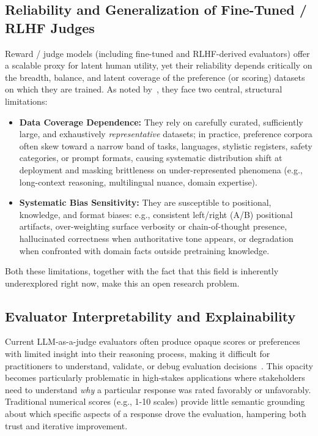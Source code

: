 \subsection{Reliability and Generalization of Fine-Tuned / RLHF Judges}
Reward / judge models (including fine-tuned and RLHF-derived evaluators) offer a scalable proxy for latent human utility, yet their reliability depends critically on the breadth, balance, and latent coverage of the preference (or scoring) datasets on which they are trained. As noted by~\cite{zhu2023judgelm}, they face two central, structural limitations:
\begin{itemize}
	\item \textbf{Data Coverage Dependence:} They rely on carefully curated, sufficiently large, and exhaustively \emph{representative} datasets; in practice, preference corpora often skew toward a narrow band of tasks, languages, stylistic registers, safety categories, or prompt formats, causing systematic distribution shift at deployment and masking brittleness on under-represented phenomena (e.g., long-context reasoning, multilingual nuance, domain expertise).
	\item \textbf{Systematic Bias Sensitivity:} They are susceptible to positional, knowledge, and format biases: e.g., consistent left/right (A/B) positional artifacts, over-weighting surface verbosity or chain-of-thought presence, hallucinated correctness when authoritative tone appears, or degradation when confronted with domain facts outside pretraining knowledge.
\end{itemize}
Both these limitations, together with the fact that this field is inherently underexplored right now, make this an open research problem.

\subsection{Evaluator Interpretability and Explainability}
Current LLM-as-a-judge evaluators often produce opaque scores or preferences with limited insight into their reasoning process, making it difficult for practitioners to understand, validate, or debug evaluation decisions~\cite{li2024_llmsasjudges}. This opacity becomes particularly problematic in high-stakes applications where stakeholders need to understand \emph{why} a particular response was rated favorably or unfavorably. Traditional numerical scores (e.g., 1-10 scales) provide little semantic grounding about which specific aspects of a response drove the evaluation, hampering both trust and iterative improvement.

